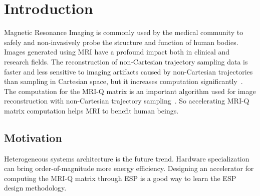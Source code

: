 \section{Introduction}
\label{sec:intro}
Magnetic Resonance Imaging is commonly used by the medical community to safely and non-invasively probe the structure and function of human bodies. Images generated using MRI have a profound impact both in clinical and research fields. The reconstruction of non-Cartesian trajectory sampling data is faster and less sensitive to imaging artifacts caused by non-Cartesian trajectories than sampling in Cartesian space, but it increases computation significantly~\cite{stone2008accelerating}. The computation for the MRI-Q matrix is an important algorithm used for image reconstruction with non-Cartesian trajectory sampling~\cite{stratton2012parboil}. So accelerating MRI-Q matrix computation helps MRI to benefit human beings.

\subsection{Motivation}
Heterogeneous systems architecture is the future trend. Hardware specialization can bring order-of-magnitude more energy efficiency. Designing an accelerator for computing the MRI-Q matrix through ESP is a good way to learn the ESP design methodology.

